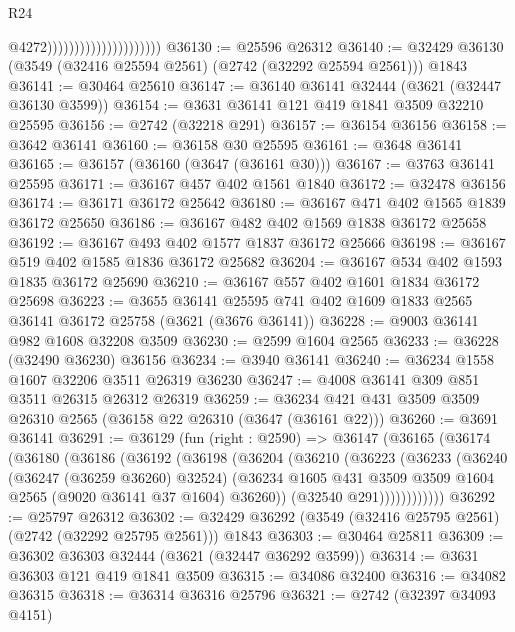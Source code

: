 \begin{lexlean}{R24}
\begin{coremodule}
                                              @4272)))))))))))))))))))))
@36130 := @25596 @26312
@36140 := @32429 @36130 (@3549 (@32416 @25594 @2561) (@2742 (@32292 @25594 @2561))) @1843
@36141 := @30464 @25610
@36147 := @36140 @36141 @32444 (@3621 (@32447 @36130 @3599))
@36154 := @3631 @36141 @121 @419 @1841 @3509 @32210 @25595
@36156 := @2742 (@32218 @291)
@36157 := @36154 @36156
@36158 := @3642 @36141
@36160 := @36158 @30 @25595
@36161 := @3648 @36141
@36165 := @36157 (@36160 (@3647 (@36161 @30)))
@36167 := @3763 @36141 @25595
@36171 := @36167 @457 @402 @1561 @1840
@36172 := @32478 @36156
@36174 := @36171 @36172 @25642
@36180 := @36167 @471 @402 @1565 @1839 @36172 @25650
@36186 := @36167 @482 @402 @1569 @1838 @36172 @25658
@36192 := @36167 @493 @402 @1577 @1837 @36172 @25666
@36198 := @36167 @519 @402 @1585 @1836 @36172 @25682
@36204 := @36167 @534 @402 @1593 @1835 @36172 @25690
@36210 := @36167 @557 @402 @1601 @1834 @36172 @25698
@36223 := @3655
    @36141
    @25595
    @741
    @402
    @1609
    @1833
    @2565
    @36141
    @36172
    @25758
    (@3621 (@3676 @36141))
@36228 := @9003 @36141 @982 @1608 @32208 @3509
@36230 := @2599 @1604 @2565
@36233 := @36228 (@32490 @36230) @36156
@36234 := @3940 @36141
@36240 := @36234 @1558 @1607 @32206 @3511 @26319 @36230
@36247 := @4008 @36141 @309 @851 @3511 @26315 @26312 @26319
@36259 := @36234 @421 @431 @3509 @3509 @26310 @2565 (@36158 @22 @26310 (@3647 (@36161 @22)))
@36260 := @3691 @36141
@36291 := @36129
    (fun (right : @2590) =>
    @36147
      (@36165
        (@36174
          (@36180
            (@36186
              (@36192
                (@36198
                  (@36204
                    (@36210
                      (@36223
                        (@36233
                          (@36240
                            (@36247 (@36259 @36260) @32524)
                            (@36234
                              @1605
                              @431
                              @3509
                              @3509
                              @1604
                              @2565
                              (@9020 @36141 @37 @1604)
                              @36260))
                          (@32540 @291))))))))))))
@36292 := @25797 @26312
@36302 := @32429 @36292 (@3549 (@32416 @25795 @2561) (@2742 (@32292 @25795 @2561))) @1843
@36303 := @30464 @25811
@36309 := @36302 @36303 @32444 (@3621 (@32447 @36292 @3599))
@36314 := @3631 @36303 @121 @419 @1841 @3509
@36315 := @34086 @32400
@36316 := @34082 @36315
@36318 := @36314 @36316 @25796
@36321 := @2742 (@32397 @34093 @4151)

\end{coremodule}
\end{lexlean}
